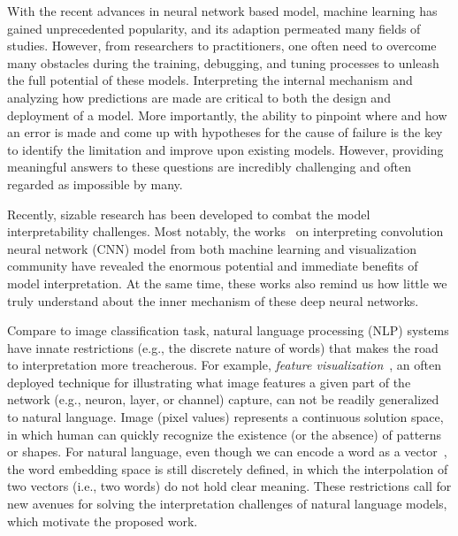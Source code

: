 \maketitle

With the recent advances in neural network based model, machine learning has gained unprecedented popularity, and its adaption permeated many fields of studies.
%
However, from researchers to practitioners, one often need to overcome many obstacles during the training, debugging, and tuning processes to unleash the full potential of these models.
%
Interpreting the internal mechanism and analyzing how predictions are made are critical to both the design and deployment of a model.
More importantly, the ability to pinpoint where and how an error is made and come up with hypotheses for the cause of failure is the key to identify the limitation and improve upon existing models.
However, providing meaningful answers to these questions are incredibly challenging and often regarded as impossible by many.

Recently, sizable research has been developed to combat the model interpretability challenges. Most notably, the works~\cite{SimonyanVedaldiZisserman2013, ZeilerFergus2014, YosinskiCluneNguyen2015, OlahMordvintsevSchubert2017, LiuShiLi2017, OlahSatyanarayanJohnson2018, BilalJourablooYe2018} on interpreting convolution neural network (CNN) model from both machine learning and visualization community have revealed the enormous potential and immediate benefits of model interpretation. At the same time, these works also remind us how little we truly understand about the inner mechanism of these deep neural networks.

Compare to image classification task, natural language processing (NLP) systems have innate restrictions (e.g., the discrete nature of words) that makes the road to interpretation more treacherous. For example, \emph{feature visualization}~\cite{OlahMordvintsevSchubert2017}, an often deployed technique for illustrating what image features a given part of the network (e.g., neuron, layer, or channel) capture, can not be readily generalized to natural language. Image (pixel values) represents a continuous solution space, in which human can quickly recognize the existence (or the absence) of patterns or shapes. For natural language, even though we can encode a word as a vector~\cite{MikolovSutskeverChen2013, PenningtonSocherManning2014}, the word embedding space is still discretely defined, in which the interpolation of two vectors (i.e., two words) do not hold clear meaning.
%
These restrictions call for new avenues for solving the interpretation challenges of natural language models, which motivate the proposed work.

